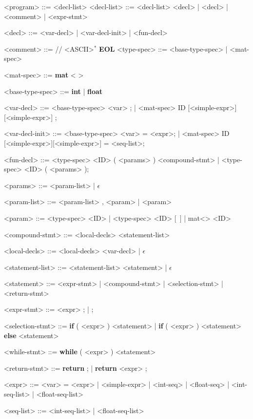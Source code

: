 \begin{grammar}
	<program> ::= <decl-list> 
	<decl-list> ::= <decl-list> <decl> | <decl> | <comment> | <expr-stmt>
	
	<decl> ::= <var-decl> | <var-decl-init> | <fun-decl>
	
	<comment> ::= // <ASCII>$^*$ \textbf{EOL}
	<type-spec> ::= <base-type-spec> | <mat-spec>
	
	<mat-spec> ::= \textbf{mat} \textless <base-type-spec> \textgreater 

	<base-type-spec> ::= \textbf{int} | \textbf{float}

	<var-decl> ::= <base-type-spec> <var> ; | <mat-spec> ID [<simple-expr>][<simple-expr>] ;
	
	<var-decl-init> ::= <base-type-spec> <var> = <expr>; | <mat-spec> ID [<simple-expr>][<simple-expr>] = {<seq-list>};
	
	<fun-decl> ::= <type-spec> <ID> ( <params> ) <compound-stmt> | <type-spec> <ID> ( <params> );
	
	<params> ::= <param-list> | $\epsilon$
	
	<param-list> ::= <param-list> , <param> | <param> 
	
	<param> ::= <type-spec> <ID> | <type-spec> <ID> $[$\ $]$ | mat\textless<type-spec-base>> <ID> 
	
	<compound-stmt> ::= { <local-decls> <statement-list> } 
	
	<local-decls> ::= <local-decls> <var-decl> | $\epsilon$ 
	
	<statement-list> ::= <statement-list> <statement> | $\epsilon$
	
	<statement> ::= <expr-stmt> | <compound-stmt> | <selection-stmt> \alt <while-stmt> | <return-stmt> 
	
	<expr-stmt> ::= <expr> ; | ; 
	
	<selection-stmt> ::= \textbf{if} ( <expr> ) <statement> | \textbf{if} ( <expr> ) <statement> \textbf{else} <statement> 
	
	<while-stmt> ::= \textbf{while} ( <expr> ) <statement> 
	
	<return-stmt> ::= \textbf{return} ; | \textbf{return} <expr> ;
	
	<expr> ::= <var> = <expr> | <simple-expr> | {<int-seq>} | {<float-seq>} | {<int-seq-list>} | {<float-seq-list>}
	
	<seq-list> ::= <int-seq-list> | <float-seq-list>


\end{grammar}
